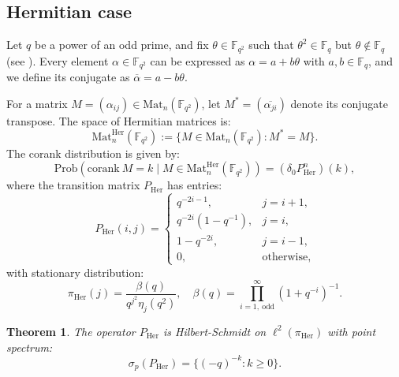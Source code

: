 \documentclass[a4]{amsart}
\newcommand{\Prob}{{\mathrm{Prob}}}
\newcommand{\Mat}{{\mathrm{Mat}}}
\newcommand{\her}{{\mathrm{Her}}}
\newcommand{\corank}{\mathrm{corank~}}
\newtheorem{theorem}{Theorem}
\theoremstyle{remark} \newtheorem{remark}[theorem]{Remark}
\begin{document}
 \subsection{Hermitian case}
Let $q$ be a power of an odd prime, and fix $\theta \in \mathbb{F}_{q^2}$ such that $\theta^2 \in \mathbb{F}_q$ but $\theta \notin \mathbb{F}_q$ (see \cite{fulman2015Steins}). Every element $\alpha \in \mathbb{F}_{q^2}$ can be expressed as $\alpha = a + b\theta$ with $a,b \in \mathbb{F}_q$, and we define its conjugate as $\overline{\alpha} = a - b\theta$. 

For a matrix $M = (\alpha_{ij}) \in \Mat_n(\mathbb{F}_{q^2})$, let $M^\ast = (\overline{\alpha_{ji}})$ denote its conjugate transpose. The space of Hermitian matrices is:
\[
\Mat_n^\her(\mathbb{F}_{q^2}) := \{M \in \Mat_n(\mathbb{F}_{q^2}) : M^\ast = M\}.
\]
The corank distribution is given by:
\[
\Prob(\corank M = k \mid M \in \Mat_n^\her(\mathbb{F}_{q^2})) = (\delta_0 P_\her^n)(k),
\]
where the transition matrix $P_\her$ has entries:
\[
P_\her(i,j) = 
\begin{cases}
q^{-2i-1}, & j = i+1, \\
q^{-2i}(1-q^{-1}), & j = i, \\
1-q^{-2i}, & j = i-1, \\
0, & \text{otherwise},
\end{cases}
\]
with stationary distribution:
\[
\pi_\her(j) = \frac{\beta(q)}{q^{j^2} \eta_j(q^2)}, \quad \beta(q) = \prod_{i=1,~ \text{odd}}^\infty (1 + q^{-i})^{-1}.
\]

\begin{theorem}
The operator $P_\her$ is Hilbert-Schmidt on $\ell^2(\pi_\her)$ with point spectrum:
\[
\sigma_p(P_\her) = \{(-q)^{-k} : k \geq 0\}.
\]
\end{theorem}
\end{document}
